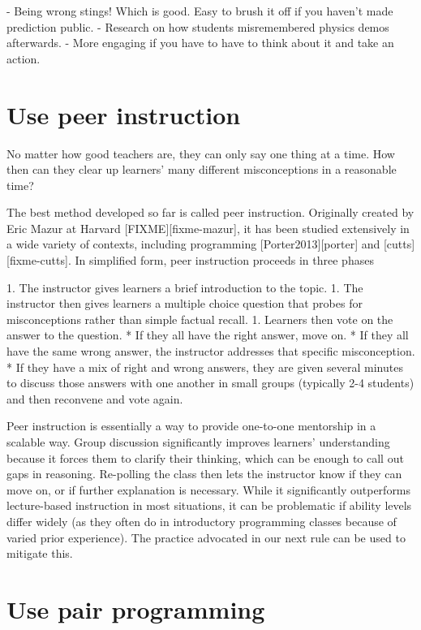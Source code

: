 \documentclass{article}
\begin{document}
- Being wrong stings!  Which is good.  Easy to brush it off if you haven't made prediction public.
- Research on how students misremembered physics demos afterwards.
- More engaging if you have to have to think about it and take an action.

\section{Use peer instruction}

No matter how good teachers are,
they can only say one thing at a time.
How then can they clear up learners' many different misconceptions
in a reasonable time?

The best method developed so far is called peer instruction.
Originally created by Eric Mazur at Harvard [FIXME][fixme-mazur],
it has been studied extensively in a wide variety of contexts,
including programming [Porter2013][porter] and [cutts][fixme-cutts].
In simplified form,
peer instruction proceeds in three phases

1. The instructor gives learners a brief introduction to the topic.
1. The instructor then gives learners a multiple choice question
   that probes for misconceptions rather than simple factual recall.
1. Learners then vote on the answer to the question.
   * If they all have the right answer, move on.
   * If they all have the same wrong answer,
     the instructor addresses that specific misconception.
   * If they have a mix of right and wrong answers,
     they are given several minutes to discuss those answers with one another
     in small groups (typically 2-4 students)
     and then reconvene and vote again.

Peer instruction is essentially
a way to provide one-to-one mentorship in a scalable way.
Group discussion significantly improves learners' understanding
because it forces them to clarify their thinking,
which can be enough to call out gaps in reasoning.
Re-polling the class then lets the instructor know if they can move on,
or if further explanation is necessary.
While it significantly outperforms lecture-based instruction in most situations,
it can be problematic if ability levels differ widely
(as they often do in introductory programming classes
because of varied prior experience).
The practice advocated in our next rule can be used to mitigate this.

\section{Use pair programming}
\end{document}
